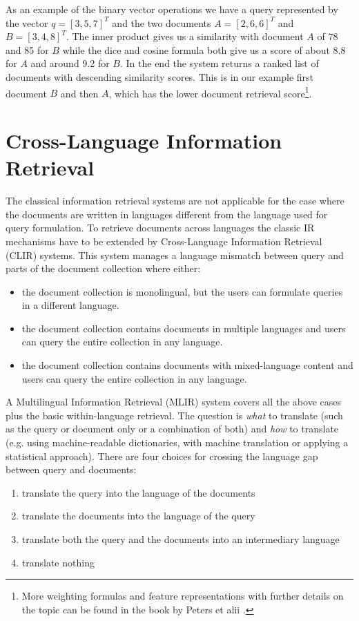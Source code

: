 \documentclass[journal]{IEEEtran}
\begin{document}
As an example of the binary vector operations we have a query represented by the vector $q = [3, 5, 7]^T$ and the two documents $A = [2, 6, 6]^T$ and $B = [3, 4, 8]^T$.
The inner product gives us a similarity with document $A$ of 78 and 85 for $B$ while the dice and cosine formula both give us a score of about 8.8 for $A$ and around 9.2 for $B$.
In the end the system returns a ranked list of documents with descending similarity scores.
This is in our example first document $B$ and then $A$, which has the lower document retrieval score\footnote{More weighting formulas and feature representations with further details on the topic can be found in the book by Peters et alii \cite{peters12}.}.



\section{Cross-Language Information Retrieval}
\label{sec:clir}
The classical information retrieval systems are not applicable for the case where the documents are written in languages different from the language used for query formulation.
To retrieve documents across languages the classic IR mechanisms have to be extended by Cross-Language Information Retrieval (CLIR) systems.
This system manages a language mismatch between query and parts of the document collection where either:
\begin{itemize}
	\item the document collection is monolingual, but the users can formulate queries in a different language.
	\item the document collection contains documents in multiple languages and users can query the entire collection in any language.
	\item the document collection contains documents with mixed-language content and users can query the entire collection in any language.
\end{itemize}
A Multilingual Information Retrieval (MLIR) system covers all the above cases plus the basic within-language retrieval.
The question is \textit{what} to translate (such as the query or document only or a combination of both) and \textit{how} to translate (e.g. using machine-readable dictionaries, with machine translation or applying a statistical approach).
There are four choices for crossing the language gap between query and documents:
\begin{enumerate}
	\item translate the query into the language of the documents
	\item translate the documents into the language of the query
	\item translate both the query and the documents into an intermediary language
	\item translate nothing
\end{enumerate}
\end{document}
